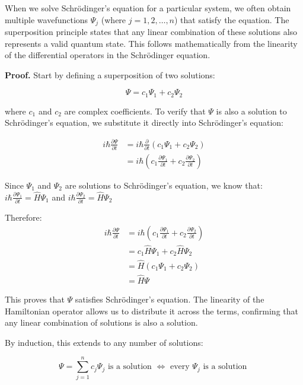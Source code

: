 \documentclass[italian]{HKNdocument}
\begin{document}
When we solve Schrödinger's equation for a particular system, we often obtain multiple wavefunctions $\Psi_{j}$ (where $j=1,2, \ldots, n$) that satisfy the equation. The superposition principle states that any linear combination of these solutions also represents a valid quantum state. This follows mathematically from the linearity of the differential operators in the Schrödinger equation.

\textbf{Proof.} Start by defining a superposition of two solutions:

\begin{equation}
\Psi=c_{1} \Psi_{1}+c_{2} \Psi_{2}
\end{equation}

where $c_1$ and $c_2$ are complex coefficients. To verify that $\Psi$ is also a solution to Schrödinger's equation, we substitute it directly into Schrödinger's equation:

\begin{align}
i \hbar \frac{\partial \Psi}{\partial t} &= i \hbar \frac{\partial}{\partial t}\left(c_{1} \Psi_{1}+c_{2} \Psi_{2}\right) \\
&= i \hbar\left(c_{1} \frac{\partial \Psi_{1}}{\partial t}+c_{2} \frac{\partial \Psi_{2}}{\partial t}\right)
\end{align}

Since $\Psi_1$ and $\Psi_2$ are solutions to Schrödinger's equation, we know that:
$i \hbar \frac{\partial \Psi_1}{\partial t} = \hat{H}\Psi_1$ and $i \hbar \frac{\partial \Psi_2}{\partial t} = \hat{H}\Psi_2$

Therefore:
\begin{align}
i \hbar \frac{\partial \Psi}{\partial t} &= i \hbar\left(c_{1} \frac{\partial \Psi_{1}}{\partial t}+c_{2} \frac{\partial \Psi_{2}}{\partial t}\right) \\
&= c_{1} \hat{H} \Psi_{1}+c_{2} \hat{H} \Psi_{2} \\
&= \hat{H}\left(c_{1} \Psi_{1}+c_{2} \Psi_{2}\right) \\
&= \hat{H} \Psi
\end{align}

This proves that $\Psi$ satisfies Schrödinger's equation. The linearity of the Hamiltonian operator allows us to distribute it across the terms, confirming that any linear combination of solutions is also a solution.

By induction, this extends to any number of solutions:

\begin{equation}
\Psi=\sum_{j=1}^{n} c_{j} \Psi_{j} \text{ is a solution } \Longleftrightarrow \text{ every } \Psi_{j} \text{ is a solution }
\end{equation}
\end{document}
